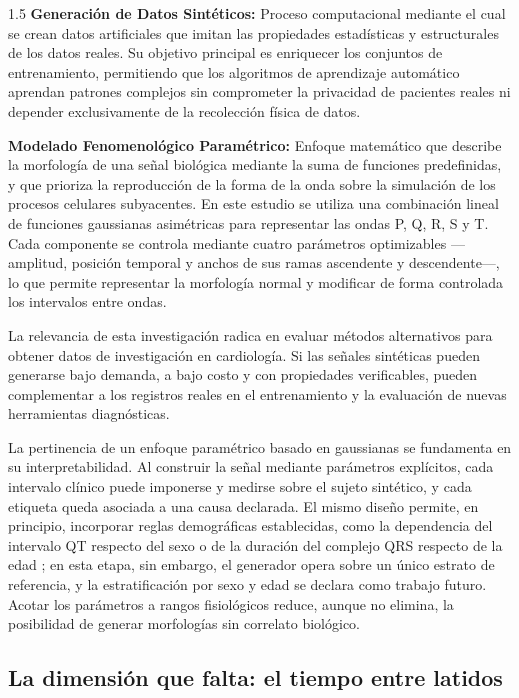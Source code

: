 \begin{spacing}{1.5}
\textbf{Generación de Datos Sintéticos:} Proceso computacional mediante el cual se crean datos artificiales que imitan las propiedades estadísticas y estructurales de los datos reales. Su objetivo principal es enriquecer los conjuntos de entrenamiento, permitiendo que los algoritmos de aprendizaje automático aprendan patrones complejos sin comprometer la privacidad de pacientes reales ni depender exclusivamente de la recolección física de datos.

\textbf{Modelado Fenomenológico Paramétrico:} Enfoque matemático que describe la morfología de una señal biológica mediante la suma de funciones predefinidas, y que prioriza la reproducción de la forma de la onda sobre la simulación de los procesos celulares subyacentes. En este estudio se utiliza una combinación lineal de funciones gaussianas asimétricas para representar las ondas P, Q, R, S y T. Cada componente se controla mediante cuatro parámetros optimizables ---amplitud, posición temporal y anchos de sus ramas ascendente y descendente---, lo que permite representar la morfología normal y modificar de forma controlada los intervalos entre ondas.

La relevancia de esta investigación radica en evaluar métodos alternativos para obtener datos de investigación en cardiología. Si las señales sintéticas pueden generarse bajo demanda, a bajo costo y con propiedades verificables, pueden complementar a los registros reales en el entrenamiento y la evaluación de nuevas herramientas diagnósticas.

La pertinencia de un enfoque paramétrico basado en gaussianas se fundamenta en su interpretabilidad. Al construir la señal mediante parámetros explícitos, cada intervalo clínico puede imponerse y medirse sobre el sujeto sintético, y cada etiqueta queda asociada a una causa declarada. El mismo diseño permite, en principio, incorporar reglas demográficas establecidas, como la dependencia del intervalo QT respecto del sexo \cite{rautaharju2009aha} o de la duración del complejo QRS respecto de la edad \cite{rijnbeek2001normal}; en esta etapa, sin embargo, el generador opera sobre un único estrato de referencia, y la estratificación por sexo y edad se declara como trabajo futuro. Acotar los parámetros a rangos fisiológicos reduce, aunque no elimina, la posibilidad de generar morfologías sin correlato biológico.

\subsection{La dimensión que falta: el tiempo entre latidos}


\end{spacing}
